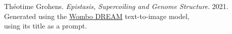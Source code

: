 \begin{vplace}[4]
\centering
Théotime Grohens.
\emph{Epistasis, Supercoiling and Genome Structure}.
2021. \\
Generated using the \href{https://www.wombo.art/}{Wombo DREAM} text-to-image model, \\ using its title as a prompt.
\end{vplace}
\thispagestyle{empty}
